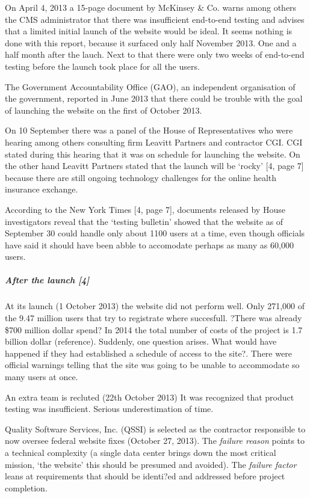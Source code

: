 \documentclass[]{article}
\let\oldsubparagraph\subparagraph
\renewcommand{\subparagraph}[1]{\oldsubparagraph{#1}\mbox{}}
\begin{document}
On April 4, 2013 a 15-page document by McKinsey \& Co. warns among
others the CMS administrator that there was insufficient end-to-end
testing and advises that a limited initial launch of the website would
be ideal. It seems nothing is done with this report, because it surfaced
only half November 2013. One and a half month after the lauch. Next to
that there were only two weeks of end-to-end testing before the launch
took place for all the users.

The Government Accountability Office (GAO), an independent organisation
of the government, reported in June 2013 that there could be trouble
with the goal of launching the website on the first of October 2013.

On 10 September there was a panel of the House of Representatives who
were hearing among others consulting firm Leavitt Partners and
contractor CGI. CGI stated during this hearing that it was on schedule
for launching the website. On the other hand Leavitt Partners stated
that the launch will be `rocky' {[}4, page 7{]} because there are still
ongoing technology challenges for the online health insurance exchange.

According to the New York Times {[}4, page 7{]}, documents released by
House investigators reveal that the `testing bulletin' showed that the
website as of September 30 could handle only about 1100 users at a time,
even though officials have said it should have been abble to accomodate
perhaps as many as 60,000 users.

\subparagraph{After the launch {[}4{]}}\label{after-the-launch-4}

At its launch (1 October 2013) the website did not perform well. Only
271,000 of the 9.47 million users that try to registrate where
succesfull. ?There was already \$700 million dollar spend? In 2014 the
total number of costs of the project is 1.7 billion dollar (reference).
Suddenly, one question arises. What would have happened if they had
established a schedule of access to the site?. There were official
warnings telling that the site was going to be unable to accommodate so
many users at once.

An extra team is recluted (22th October 2013) It was recognized that
product testing was insufficient. Serious underestimation of time.

Quality Software Services, Inc. (QSSI) is selected as the contractor
responsible to now oversee federal website fixes (October 27, 2013). The
\emph{failure reason} points to a technical complexity (a single data
center brings down the most critical mission, `the website' this should
be presumed and avoided). The \emph{failure factor} leans at
requirements that should be identi?ed and addressed before project
completion.
\end{document}
